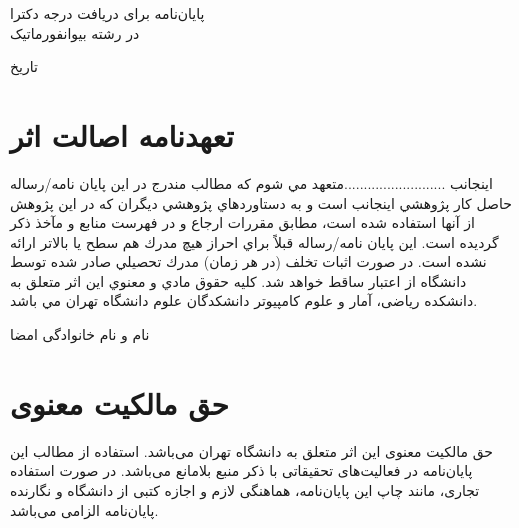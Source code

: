 \documentclass[12pt]{report}
\begin{document}
\vfill
{\small
\begin{center}
 پایان‌نامه برای دریافت درجه دکترا
\\
در رشته بیوانفورماتیک
\end{center}

\begin{center}
تاریخ 
\end{center}
}
\pagestyle{empty}
\pagenumbering{}


\pagestyle{plain}
\setcounter{page}{1}






\chapter*{تعهدنامه اصالت اثر}
اينجانب  ..........................متعهد مي شوم كه مطالب مندرج در اين پايان نامه/رساله حاصل كار پژوهشي اينجانب است و به دستاوردهاي پژوهشي ديگران كه در اين پژوهش از آنها استفاده شده است، مطابق مقررات ارجاع و در فهرست منابع و مآخذ ذكر گرديده است. اين پايان نامه/رساله قبلاً براي احراز هيچ مدرك هم سطح يا بالاتر ارائه نشده است. در صورت اثبات تخلف (در هر زمان) مدرك تحصيلي صادر شده توسط دانشگاه از اعتبار ساقط خواهد شد. 
كليه حقوق مادي و معنوي اين اثر متعلق به دانشكده ریاضی، آمار و علوم کامپیوتر دانشکدگان علوم دانشگاه تهران مي باشد. 
\begin{flushleft}
نام و نام خانوادگی
امضا 
\end{flushleft}

\chapter*{حق مالکیت معنوی}
حق مالکیت معنوی این اثر متعلق به دانشگاه تهران می‌باشد. استفاده از مطالب این پایان‌نامه در فعالیت‌های تحقیقاتی با ذکر منبع بلامانع می‌باشد. در صورت استفاده تجاری، مانند چاپ این پایان‌نامه، هماهنگی لازم و اجازه کتبی از دانشگاه و نگارنده پایان‌نامه الزامی می‌باشد.
\end{document}
